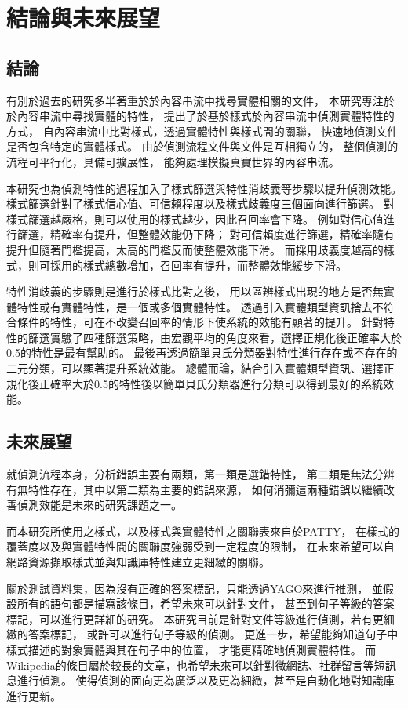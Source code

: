 %
%
%
\chapter{結論與未來展望}
\label{c:future}

\section{結論}
有別於過去的研究多半著重於於內容串流中找尋實體相關的文件，
本研究專注於於內容串流中尋找實體的特性，
提出了於基於樣式於內容串流中偵測實體特性的方式，
自內容串流中比對樣式，透過實體特性與樣式間的關聯，
快速地偵測文件是否包含特定的實體樣式。
由於偵測流程文件與文件是互相獨立的，
整個偵測的流程可平行化，具備可擴展性，
能夠處理模擬真實世界的內容串流。

本研究也為偵測特性的過程加入了樣式篩選與特性消歧義等步驟以提升偵測效能。
樣式篩選針對了樣式信心值、可信賴程度以及樣式歧義度三個面向進行篩選。
對樣式篩選越嚴格，則可以使用的樣式越少，因此召回率會下降。
例如對信心值進行篩選，精確率有提升，但整體效能仍下降；
對可信賴度進行篩選，精確率隨有提升但隨著門檻提高，太高的門檻反而使整體效能下滑。
而採用歧義度越高的樣式，則可採用的樣式總數增加，召回率有提升，而整體效能緩步下滑。

特性消歧義的步驟則是進行於樣式比對之後，
用以區辨樣式出現的地方是否無實體特性或有實體特性，是一個或多個實體特性。
透過引入實體類型資訊捨去不符合條件的特性，可在不改變召回率的情形下使系統的效能有顯著的提升。
針對特性的篩選實驗了四種篩選策略，由宏觀平均的角度來看，選擇正規化後正確率大於0.5的特性是最有幫助的。
最後再透過簡單貝氏分類器對特性進行存在或不存在的二元分類，可以顯著提升系統效能。
總體而論，結合引入實體類型資訊、選擇正規化後正確率大於0.5的特性後以簡單貝氏分類器進行分類可以得到最好的系統效能。

\section{未來展望}
就偵測流程本身，分析錯誤主要有兩類，第一類是選錯特性，
第二類是無法分辨有無特性存在，其中以第二類為主要的錯誤來源，
如何消彌這兩種錯誤以繼續改善偵測效能是未來的研究課題之一。

而本研究所使用之樣式，以及樣式與實體特性之關聯表來自於PATTY，
在樣式的覆蓋度以及與實體特性間的關聯度強弱受到一定程度的限制，
在未來希望可以自網路資源擷取樣式並與知識庫特性建立更細緻的關聯。

關於測試資料集，因為沒有正確的答案標記，只能透過YAGO來進行推測，
並假設所有的語句都是描寫該條目，希望未來可以針對文件，
甚至到句子等級的答案標記，可以進行更詳細的研究。
本研究目前是針對文件等級進行偵測，若有更細緻的答案標記，
或許可以進行句子等級的偵測。
更進一步，希望能夠知道句子中樣式描述的對象實體與其在句子中的位置，
才能更精確地偵測實體特性。
而Wikipedia的條目屬於較長的文章，也希望未來可以針對微網誌、社群留言等短訊息進行偵測。
使得偵測的面向更為廣泛以及更為細緻，甚至是自動化地對知識庫進行更新。


